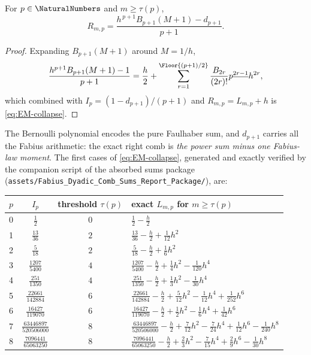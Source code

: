 \documentclass[11pt,oneside]{article}
\numberwithin{equation}{section}
\theoremstyle{definition}
\theoremstyle{remark}
\newcommand{\fall}[2]{#1^{\underline{#2}}}
\begin{document}
\begin{corollary}
\label{thm:F-stabilization}
For $p\in\NaturalNumbers$ and $m\ge\tau(p)$,
\begin{equation}
 \boxed{\;
 R_{m,p}
 =\frac{h^{\,p+1}B_{p+1}(M+1)-d_{p+1}}{p+1}.
 \;}
 \label{eq:F-stabilized-Bernoulli}
\end{equation}
\end{corollary}

\begin{proof}
Expanding $B_{p+1}(M+1)$ around $M=1/h$,
\[
 \frac{h^{p+1}B_{p+1}(M+1)-1}{p+1}
 =\frac h2+\sum_{r=1}^{\Floor{(p+1)/2}}
 \frac{B_{2r}}{(2r)!}\fall p{2r-1}h^{2r},
\]
which combined with $I_p=(1-d_{p+1})/(p+1)$ and
$R_{m,p}=L_{m,p}+h$ is \eqref{eq:EM-collapse}.
\end{proof}

The Bernoulli polynomial encodes the pure Faulhaber sum, and
$d_{p+1}$ carries all the Fabius arithmetic: the exact right comb is
\emph{the power sum minus one Fabius-law moment}.  The first cases of
\eqref{eq:EM-collapse}, generated and exactly verified by the
companion script of the absorbed sums package
(\nolinkurl{assets/Fabius_Dyadic_Comb_Sums_Report_Package/}), are:

\begin{center}
\small
\begin{tabular}{c c c l}
\toprule
$p$ & $I_p$ & threshold $\tau(p)$ & exact $L_{m,p}$ for $m\ge\tau(p)$ \\
\midrule
0 & $\frac{1}{2}$ & $0$ & $\frac{1}{2}-\frac{h}{2}$ \\
1 & $\frac{13}{36}$ & $2$ & $\frac{13}{36}-\frac{h}{2}+\frac{1}{12}h^{2}$ \\
2 & $\frac{5}{18}$ & $2$ & $\frac{5}{18}-\frac{h}{2}+\frac{1}{6}h^{2}$ \\
3 & $\frac{1207}{5400}$ & $4$ & $\frac{1207}{5400}-\frac{h}{2}+\frac{1}{4}h^{2}-\frac{1}{120}h^{4}$ \\
4 & $\frac{251}{1350}$ & $4$ & $\frac{251}{1350}-\frac{h}{2}+\frac{1}{3}h^{2}-\frac{1}{30}h^{4}$ \\
5 & $\frac{22661}{142884}$ & $6$ & $\frac{22661}{142884}-\frac{h}{2}+\frac{5}{12}h^{2}-\frac{1}{12}h^{4}+\frac{1}{252}h^{6}$ \\
6 & $\frac{16427}{119070}$ & $6$ & $\frac{16427}{119070}-\frac{h}{2}+\frac{1}{2}h^{2}-\frac{1}{6}h^{4}+\frac{1}{42}h^{6}$ \\
7 & $\frac{63446897}{520506000}$ & $8$ & $\frac{63446897}{520506000}-\frac{h}{2}+\frac{7}{12}h^{2}-\frac{7}{24}h^{4}+\frac{1}{12}h^{6}-\frac{1}{240}h^{8}$ \\
8 & $\frac{7096441}{65063250}$ & $8$ & $\frac{7096441}{65063250}-\frac{h}{2}+\frac{2}{3}h^{2}-\frac{7}{15}h^{4}+\frac{2}{9}h^{6}-\frac{1}{30}h^{8}$ \\
\bottomrule
\end{tabular}
\label{tab:integer-closed}
\end{center}
\end{document}
